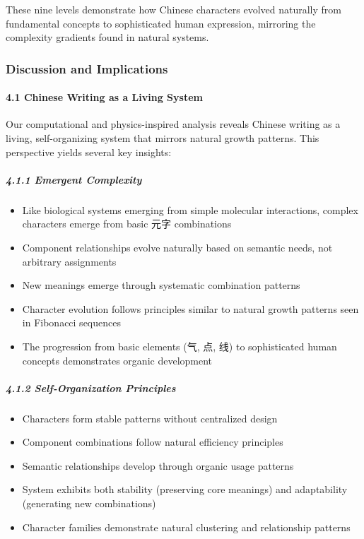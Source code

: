 These nine levels demonstrate how Chinese characters evolved naturally
from fundamental concepts to sophisticated human expression, mirroring
the complexity gradients found in natural systems.

\hypertarget{discussion-and-implications}{%
\subsubsection{Discussion and
Implications}\label{discussion-and-implications}}

\hypertarget{chinese-writing-as-a-living-system}{%
\paragraph{4.1 Chinese Writing as a Living
System}\label{chinese-writing-as-a-living-system}}

Our computational and physics-inspired analysis reveals Chinese writing
as a living, self-organizing system that mirrors natural growth
patterns. This perspective yields several key insights:

\hypertarget{emergent-complexity}{%
\subparagraph{4.1.1 Emergent Complexity}\label{emergent-complexity}}

\begin{itemize}
\tightlist
\item
  Like biological systems emerging from simple molecular interactions,
  complex characters emerge from basic 元字 combinations
\item
  Component relationships evolve naturally based on semantic needs, not
  arbitrary assignments
\item
  New meanings emerge through systematic combination patterns
\item
  Character evolution follows principles similar to natural growth
  patterns seen in Fibonacci sequences
\item
  The progression from basic elements (气, 点, 线) to sophisticated
  human concepts demonstrates organic development
\end{itemize}

\hypertarget{self-organization-principles}{%
\subparagraph{4.1.2 Self-Organization
Principles}\label{self-organization-principles}}

\begin{itemize}
\tightlist
\item
  Characters form stable patterns without centralized design
\item
  Component combinations follow natural efficiency principles
\item
  Semantic relationships develop through organic usage patterns
\item
  System exhibits both stability (preserving core meanings) and
  adaptability (generating new combinations)
\item
  Character families demonstrate natural clustering and relationship
  patterns
\end{itemize}

